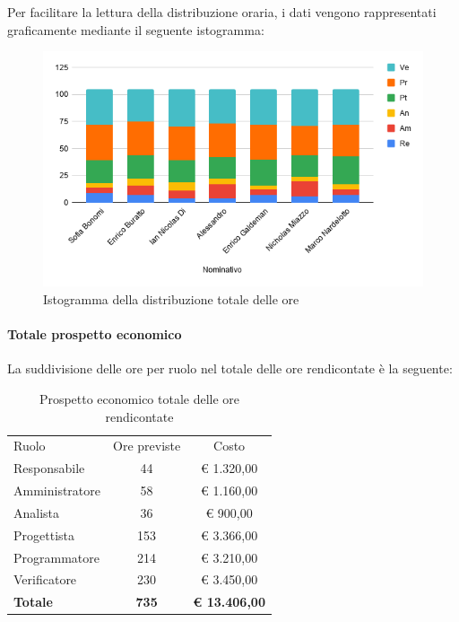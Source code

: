 \documentclass[../piano-di-progetto.tex]{subfiles}
\begin{document}
      Per facilitare la lettura della distribuzione oraria, i dati vengono rappresentati graficamente mediante il seguente istogramma:
      \begin{figure}[H]
        \centering
        \includegraphics[width=12cm]{img/ore-rendicontate.png}
        \caption{Istogramma della distribuzione totale delle ore}
        \label{fig:ore-rendicontate}
      \end{figure}
  
      \paragraph{Totale prospetto economico}
      La suddivisione delle ore per ruolo nel totale delle ore rendicontate è la seguente:
      \begin{table}[H]
        \centering
        \begin{tabular}{lcc}
          Ruolo           & Ore previste & Costo                \\
          Responsabile    & 44           & € 1.320,00           \\
          Amministratore  & 58           & € 1.160,00           \\
          Analista        & 36           & € 900,00             \\
          Progettista     & 153          & € 3.366,00           \\
          Programmatore   & 214          & € 3.210,00           \\
          Verificatore    & 230          & € 3.450,00           \\
          \textbf{Totale} & \textbf{735} & \textbf{€ 13.406,00}
        \end{tabular}
        \caption{Prospetto economico totale delle ore rendicontate}
      \end{table}
  
\end{document}
